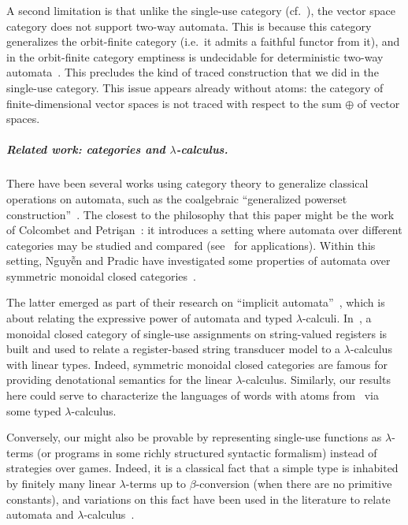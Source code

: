 \documentclass[a4paper,UKenglish,cleveref, autoref, numberwithinsect, thm-restate]{lipics-v2021}
\begin{document}
A second limitation is that unlike the single-use category (cf.\ ), the vector space category does not support two-way automata. This is because this category generalizes the orbit-finite category (i.e.~it admits a faithful functor from it), and in the orbit-finite category emptiness is undecidable for deterministic two-way automata~\cite[Theorem 5.3]{nevenFiniteStateMachines2004}. This precludes the kind of traced construction that we did in the single-use category. This issue appears already without atoms: the category of finite-dimensional vector spaces is not traced with respect to the sum $\oplus$ of vector spaces. 

\subparagraph{Related work: categories and $\lambda$-calculus.}

There have been several works using category theory to generalize classical operations on automata, such as the coalgebraic ``generalized powerset construction''~\cite{DBLP:journals/corr/abs-1302-1046}. The closest to the philosophy that this paper might be the work of Colcombet and Petrişan~\cite{colcombet2020automata}: it introduces a setting where automata over different categories may be studied and compared (see~\cite{ColcombetPS21,Aristote24} for applications). Within this setting, Nguy{\~{ê}}n and Pradic have investigated some properties of automata over symmetric monoidal closed categories~\cite[Sections~1.2.3~and~4.7--4.8]{titoPhD}.

The latter emerged as part of their research on ``implicit automata''~\cite{IATLC,IATLC2,titoPhD,pradic2024implicit}, which is about relating the expressive power of automata and typed $\lambda$-calculi. In~\cite{IATLC2,titoPhD}, a monoidal closed category of single-use assignments on string-valued registers is built and used to relate a register-based string transducer model to a $\lambda$-calculus with linear types. Indeed, symmetric monoidal closed categories are famous for providing denotational semantics for the linear $\lambda$-calculus. Similarly, our results here could serve to characterize the languages of words with atoms from~\cite{bojanczykstefanski2020} via some typed $\lambda$-calculus.

Conversely, our  might also be provable by representing single-use functions as $\lambda$-terms (or programs in some richly structured syntactic formalism) instead of strategies over games. Indeed, it is a classical fact that a simple type is inhabited by finitely many linear $\lambda$-terms up to $\beta$-conversion (when there are no primitive constants), and variations on this fact have been used in the literature to relate automata and $\lambda$-calculus~\cite{IATLC,LambdaTransducer}.




\end{document}

